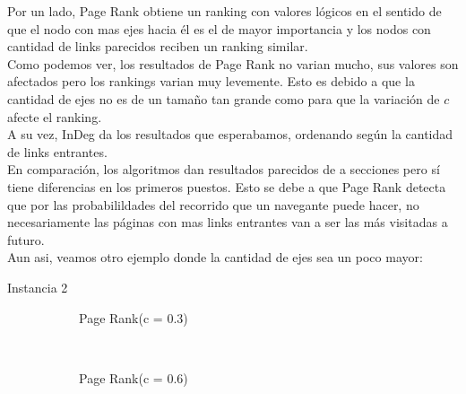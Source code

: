 Por un lado, Page Rank obtiene un ranking con valores lógicos en el sentido de que el nodo con mas ejes hacia él es el de mayor importancia y los nodos con cantidad de links parecidos reciben un ranking similar.\\
Como podemos ver, los resultados de Page Rank no varian mucho, sus valores son afectados pero los rankings varian muy levemente. Esto es debido a que la cantidad de ejes no es de un tamaño tan grande como para que la variación de $c$ afecte el ranking.\\
A su vez, InDeg da los resultados que esperabamos, ordenando según la cantidad de links entrantes.\\
En comparación, los algoritmos dan resultados parecidos de a secciones pero sí tiene diferencias en los primeros puestos. Esto se debe a que Page Rank detecta que por las probabilildades del recorrido que un navegante puede hacer, no necesariamente las páginas con mas links entrantes van a ser las más visitadas a futuro.\\

Aun asi, veamos otro ejemplo donde la cantidad de ejes sea un poco mayor:

\begin{center}
Instancia 2
\end{center}

\begin{figure}[H]
    \centering
    \begin{subfigure}[t]{0.5\textwidth}
      \begin{center}
        Page Rank(c = 0.3)\\
      \end{center}
    \end{subfigure}%
    ~
    \begin{subfigure}[t]{0.5\textwidth}
      \begin{center}
        Page Rank(c = 0.6)\\
      \end{center}
    \end{subfigure}
\end{figure}

